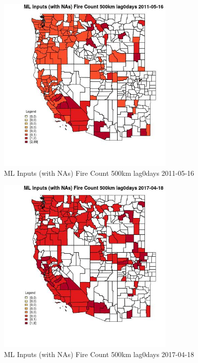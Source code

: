\begin{figure} 
\centering  
\includegraphics[width=0.77\textwidth]{Code_Outputs/Report_ML_input_PM25_Step4_part_e_de_duplicated_aves_compiled_2019-05-21wNAs_CountyFire_Count_500km_lag0daysMean2011-05-16.jpg} 
\caption{\label{fig:Report_ML_input_PM25_Step4_part_e_de_duplicated_aves_compiled_2019-05-21wNAsCountyFire_Count_500km_lag0daysMean2011-05-16}ML Inputs (with NAs) Fire Count 500km lag0days 2011-05-16} 
\end{figure} 
 

\begin{figure} 
\centering  
\includegraphics[width=0.77\textwidth]{Code_Outputs/Report_ML_input_PM25_Step4_part_e_de_duplicated_aves_compiled_2019-05-21wNAs_CountyFire_Count_500km_lag0daysMean2017-04-18.jpg} 
\caption{\label{fig:Report_ML_input_PM25_Step4_part_e_de_duplicated_aves_compiled_2019-05-21wNAsCountyFire_Count_500km_lag0daysMean2017-04-18}ML Inputs (with NAs) Fire Count 500km lag0days 2017-04-18} 
\end{figure} 
 

